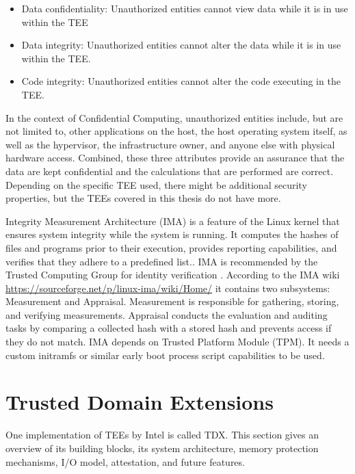 \begin{itemize} 
    \item \guillemotright Data confidentiality: Unauthorized entities cannot view data while it is in use within the \Gls{TEE}
    \item Data integrity: Unauthorized entities cannot alter the data while it is in use within the \Gls{TEE}.
    \item Code integrity: Unauthorized entities cannot alter the code executing in the \Gls{TEE}.\guillemotleft \cite{noauthor_ccc_outreach_whitepaper_updated_november_2022pdf_2023}
\end{itemize} 
In the context of Confidential Computing, unauthorized entities include, but are not limited to, other applications on the host, the host operating system itself, as well as the hypervisor, the infrastructure owner, and anyone else with physical hardware access. 
Combined, these three attributes provide an assurance that the data are kept confidential and the calculations that are performed are correct.
Depending on the specific \Gls{TEE} used, there might be additional security properties, but the \Gls{TEE}s covered in this thesis do not have more\cite{noauthor_ccc_outreach_whitepaper_updated_november_2022pdf_2023}.


\label{IMA}

Integrity Measurement Architecture (IMA) is a feature of the Linux kernel that ensures system integrity while the system is running. It computes the hashes of files and programs prior to their execution, provides reporting capabilities, and verifies that they adhere to a predefined list.\cite{Luo_container_ima}. IMA is recommended by the Trusted Computing Group for identity verification \cite{trusted_computing_group_tcg_2023}. According to the IMA wiki \url{https://sourceforge.net/p/linux-ima/wiki/Home/} it contains two subsystems: Measurement and Appraisal. Measurement is responsible for gathering, storing, and verifying measurements. Appraisal conducts the evaluation and auditing tasks by comparing a collected hash with a stored hash and prevents access if they do not match. IMA depends on Trusted Platform Module (TPM)\cite{Luo_container_ima}. It needs a custom initramfs or similar early boot process script capabilities to be used.

\section{Trusted Domain Extensions}
One implementation of \Gls{TEE}s by Intel is called \Gls{TDX}. This section gives an overview of its building blocks, its system architecture, memory protection mechanisms, I/O model, attestation, and future features.
